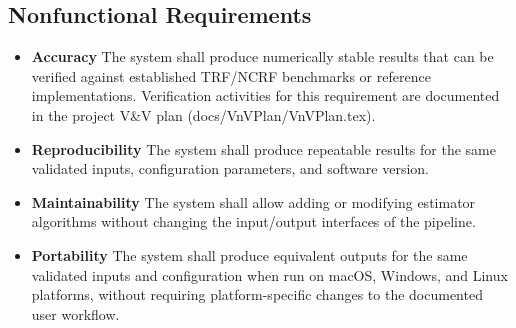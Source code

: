 \documentclass[12pt]{article}
\begin{document}

\subsection{Nonfunctional Requirements}


\noindent
\begin{itemize}

\item[NFR1:] \textbf{Accuracy}  
The system shall produce numerically stable results that can be verified against established TRF/NCRF benchmarks or reference implementations. Verification activities for this requirement are documented in the project V\&V plan (docs/VnVPlan/VnVPlan.tex).

\item[NFR2:] \textbf{Reproducibility}  
The system shall produce repeatable results for the same validated inputs, configuration parameters, and software version.

\item[NFR3:] \textbf{Maintainability}  
The system shall allow adding or modifying estimator algorithms without changing the input/output interfaces of the pipeline.

\item[NFR4:] \textbf{Portability}  
The system shall produce equivalent outputs for the same validated inputs and configuration when run on macOS, Windows, and Linux platforms, without requiring platform-specific changes to the documented user workflow.

\end{itemize}
\end{document}
